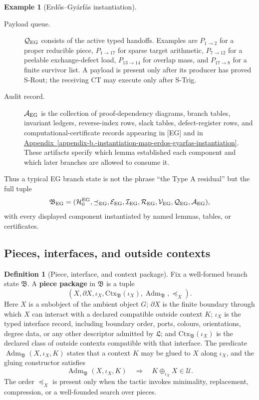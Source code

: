 \documentclass[
  11pt,
]{article}
\theoremstyle{definition}
\newtheorem{definition}{Definition}[section]
\newtheorem{example}{Example}[section]
\newcommand{\appref}[1]{\hyperref[#1]{Appendix~\ref*{#1}}}
\begin{document}
\begin{example}[Erdős--Gyárfás instantiation]
\begin{description}
\item[Payload queue.]
\(\mathcal Q_{\rm EG}\) consists of the active typed handoffs.  Examples
are \(P_{1\to2}\) for a proper reducible piece, \(P_{1\to17}\) for sparse
target arithmetic, \(P_{7\to12}\) for a peelable exchange-defect load,
\(P_{13\to14}\) for overlap mass, and \(P_{17\to8}\) for a finite
survivor list.  A payload is present only after its producer has proved
S-Rout; the receiving CT may execute only after S-Trig.

\item[Audit record.]
\(\mathcal A_{\rm EG}\) is the collection of proof-dependency diagrams,
branch tables, invariant ledgers, reverse-index rows, slack tables,
defect-register rows, and computational-certificate records appearing in
{[}EG{]} and in \appref{appendix-b.-instantiation-map-erdos-gyarfas-instantiation}.  These
artifacts specify which lemma established each component and which later
branches are allowed to consume it.
\end{description}

Thus a typical EG branch state is not the phrase ``the Type A residual''
but the full tuple
\[
\mathfrak B_{\rm EG}
=
(\mathcal H^{\rm EG}_0,\preceq_{\rm EG},\mathcal E_{\rm EG},
 \mathcal I_{\rm EG},\mathcal R_{\rm EG},
 \mathcal V_{\rm EG},\mathcal Q_{\rm EG},\mathcal A_{\rm EG}),
\]
with every displayed component instantiated by named lemmas, tables, or
certificates.
\end{example}

\subsection{Pieces, interfaces, and outside contexts}\label{data-pieces-interfaces}
\begin{definition}[Piece, interface, and context package]\label{def:piece-interface-context}
Fix a well-formed branch state \(\mathfrak B\).  A \textbf{piece
package} in \(\mathfrak B\) is a tuple
\[
(X,\partial X,\iota_X,\mathrm{Ctx}_{\mathfrak B}(\iota_X),
  \operatorname{Adm}_{\mathfrak B},\preceq_X).
\]
Here \(X\) is a subobject of the ambient object \(G\); \(\partial X\) is
the finite boundary through which \(X\) can interact with a declared
compatible outside context \(K\);
\(\iota_X\) is the typed interface record, including boundary order,
ports, colours, orientations, degree data, or any other descriptor
admitted by \(\mathfrak L\); and
\(\mathrm{Ctx}_{\mathfrak B}(\iota_X)\) is the declared class of outside
contexts compatible with that interface.  The predicate
\(\operatorname{Adm}_{\mathfrak B}(X,\iota_X,K)\) states that a context
\(K\) may be glued to \(X\) along \(\iota_X\), and the gluing constructor
satisfies
\[
\operatorname{Adm}_{\mathfrak B}(X,\iota_X,K)
\quad\Longrightarrow\quad
K\oplus_{\iota_X}X\in\mathcal U.
\]
The order
\(\preceq_X\) is present only when the tactic invokes minimality,
replacement, compression, or a well-founded search over pieces.
\end{definition}
\end{document}
